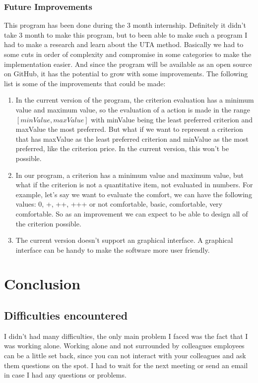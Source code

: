 \documentclass{report}
\begin{document}
\subsection{Future Improvements}
This program has been done during the 3 month internship. Definitely it didn't take 3 month to make this program, but to been able to make such a program I had to make a research and learn about the UTA method. Basically we had to some cuts in order of complexity and compromise in some categories to make the implementation easier. And since the program will be available as an open source on GitHub, it has the potential to grow with some improvements. The following list is some of the improvements that could be made:\\
\begin{enumerate}
\item In the current version of the program, the criterion evaluation has a minimum value and maximum value, so the evaluation of a action is made in the range $[minValue, maxValue]$ with minValue being the least preferred criterion and maxValue the most preferred. But what if we want to represent a criterion that has maxValue as the least preferred criterion and minValue as the most preferred, like the criterion price. In the current version, this won't be possible. 
\item In our program, a criterion has a minimum value and maximum value, but what if the criterion is not a quantitative item, not evaluated in numbers. For example, let's say we want to evaluate the comfort, we can have the following values: 0, +, ++, +++ or not comfortable, basic, comfortable, very comfortable. So as an improvement we can expect to be able to design all of the criterion possible. 
\item The current version doesn't support an graphical interface. A graphical interface can be handy to make the software more user friendly. 
\end{enumerate} 

\chapter{Conclusion}
\section{Difficulties encountered}
I didn't had many difficulties, the only main problem I faced was the fact that I was working alone. Working alone and not surrounded by colleagues employees can be a little set back, since you can not interact with your colleagues and ask them questions on the spot. I had to wait for the next meeting or send an email in case I had any questions or problems.\\
\end{document}

